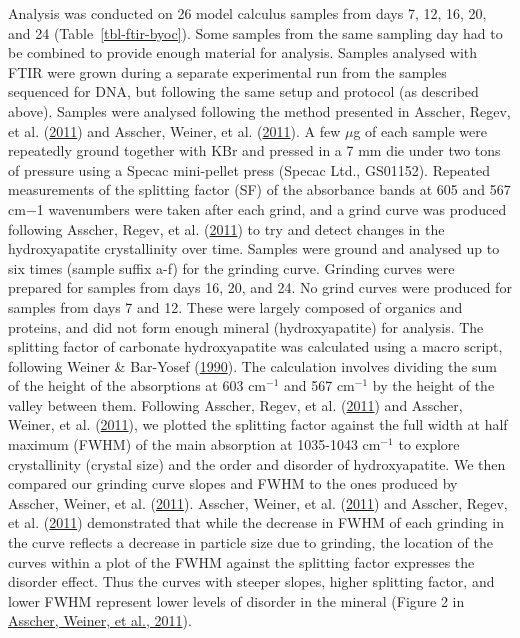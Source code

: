 \documentclass[
  letterpaper,
]{book}
\begin{document}
Analysis was conducted on 26 model calculus samples from days 7, 12, 16,
20, and 24 (Table~\ref{tbl-ftir-byoc}). Some samples from the same
sampling day had to be combined to provide enough material for analysis.
Samples analysed with FTIR were grown during a separate experimental run
from the samples sequenced for DNA, but following the same setup and
protocol (as described above). Samples were analysed following the
method presented in Asscher, Regev, et al.
(\protect\hyperlink{ref-asscherAtomicDisorder2011}{2011}) and Asscher,
Weiner, et al.
(\protect\hyperlink{ref-asscherVariationsAtomic2011}{2011}). A few
\(\mu\)g of each sample were repeatedly ground together with KBr and
pressed in a 7 mm die under two tons of pressure using a Specac
mini-pellet press (Specac Ltd., GS01152). Repeated measurements of the
splitting factor (SF) of the absorbance bands at 605 and 567 cm−1
wavenumbers were taken after each grind, and a grind curve was produced
following Asscher, Regev, et al.
(\protect\hyperlink{ref-asscherAtomicDisorder2011}{2011}) to try and
detect changes in the hydroxyapatite crystallinity over time. Samples
were ground and analysed up to six times (sample suffix a-f) for the
grinding curve. Grinding curves were prepared for samples from days 16,
20, and 24. No grind curves were produced for samples from days 7 and
12. These were largely composed of organics and proteins, and did not
form enough mineral (hydroxyapatite) for analysis. The splitting factor
of carbonate hydroxyapatite was calculated using a macro script,
following Weiner \& Bar-Yosef
(\protect\hyperlink{ref-weinerStatesPreservation1990}{1990}). The
calculation involves dividing the sum of the height of the absorptions
at 603 cm\(^{-1}\) and 567 cm\(^{-1}\) by the height of the valley
between them. Following Asscher, Regev, et al.
(\protect\hyperlink{ref-asscherAtomicDisorder2011}{2011}) and Asscher,
Weiner, et al.
(\protect\hyperlink{ref-asscherVariationsAtomic2011}{2011}), we plotted
the splitting factor against the full width at half maximum (FWHM) of
the main absorption at 1035-1043 cm\(^{-1}\) to explore crystallinity
(crystal size) and the order and disorder of hydroxyapatite. We then
compared our grinding curve slopes and FWHM to the ones produced by
Asscher, Weiner, et al.
(\protect\hyperlink{ref-asscherVariationsAtomic2011}{2011}). Asscher,
Weiner, et al.
(\protect\hyperlink{ref-asscherVariationsAtomic2011}{2011}) and Asscher,
Regev, et al. (\protect\hyperlink{ref-asscherAtomicDisorder2011}{2011})
demonstrated that while the decrease in FWHM of each grinding in the
curve reflects a decrease in particle size due to grinding, the location
of the curves within a plot of the FWHM against the splitting factor
expresses the disorder effect. Thus the curves with steeper slopes,
higher splitting factor, and lower FWHM represent lower levels of
disorder in the mineral (Figure 2 in
\protect\hyperlink{ref-asscherVariationsAtomic2011}{Asscher, Weiner, et
al., 2011}).
\end{document}

